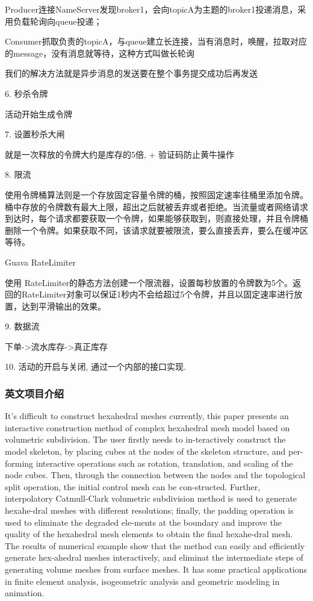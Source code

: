 \documentclass[UTF8]{ctexart}
\begin{document}
Producer连接NameServer发现broker1，会向topicA为主题的broker1投递消息，采用负载轮询向queue投递；

Consumer抓取负责的topicA，与queue建立长连接，当有消息时，唤醒，拉取对应的message，没有消息就等待，这种方式叫做长轮询

我们的解决方法就是异步消息的发送要在整个事务提交成功后再发送

6. 秒杀令牌

活动开始生成令牌

7. 设置秒杀大闸

就是一次释放的令牌大约是库存的5倍, + 验证码防止黄牛操作

8. 限流

使用令牌桶算法则是一个存放固定容量令牌的桶，按照固定速率往桶里添加令牌。桶中存放的令牌数有最大上限，超出之后就被丢弃或者拒绝。当流量或者网络请求到达时，每个请求都要获取一个令牌，如果能够获取到，则直接处理，并且令牌桶删除一个令牌。如果获取不同，该请求就要被限流，要么直接丢弃，要么在缓冲区等待。

Guava RateLimiter


使用 RateLimiter的静态方法创建一个限流器，设置每秒放置的令牌数为5个。返回的RateLimiter对象可以保证1秒内不会给超过5个令牌，并且以固定速率进行放置，达到平滑输出的效果。

9. 数据流

下单->流水库存->真正库存


10. 活动的开启与关闭, 通过一个内部的接口实现.

\subsubsection{英文项目介绍}

It’s difficult to construct hexahedral meshes currently, this paper presents an interactive construction method of complex hexahedral mesh model based on volumetric subdivision. The user firstly needs to in-teractively construct the model skeleton, by placing cubes at the nodes of the skeleton structure, and per-forming interactive operations such as rotation, translation, and scaling of the node cubes. Then, through the connection between the nodes and the topological split operation, the initial control mesh can be con-structed. Further, interpolatory Catmull-Clark volumetric subdivision method is used to generate hexahe-dral meshes with different resolutions; finally, the padding operation is used to eliminate the degraded ele-ments at the boundary and improve the quality of the hexahedral mesh elements to obtain the final hexahe-dral mesh. The results of numerical example show that the method can easily and efficiently generate hex-ahedral meshes interactively, and eliminat the intermediate steps of generating volume meshes from surface meshes. It has some practical applications in finite element analysis, isogeometric analysis and geometric modeling in animation.
\end{document}
